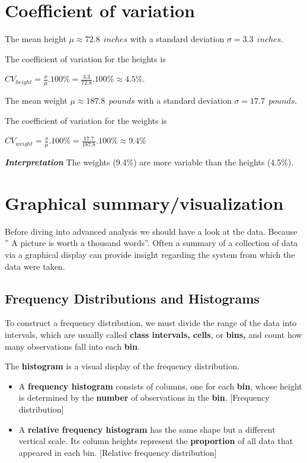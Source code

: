 \documentclass[
  11pt,
  letterpaper,
  DIV=11,
  numbers=noendperiod]{scrreprt}
\begin{document}
\section{Coefficient of variation}

The mean height \(\mu \approx 72.8 \ \ inches\) with a standard
deviation \(\sigma =3.3 \ \ inches\).

The coefficient of variation for the heights is

\hfill\break
\(CV_{height}=\frac{\sigma}{\mu}.100\%=\frac{3.3}{72.8} . 100\% \approx 4.5\%\).

The mean weight \(\mu \approx 187.8 \ \ pounds\) with a standard
deviation \(\sigma =17.7 \ \ pounds\).

The coefficient of variation for the weights is

\(CV_{weight}=\frac{\sigma}{\mu}.100\%=\frac{17.7}{187.8}.100\% \approx9.4\%\)

\textbf{\emph{Interpretation}} The weights (9.4\%) are more variable
than the heights (4.5\%).

\section{Graphical
summary/visualization}\label{graphical-summaryvisualization}

Before diving into advanced analysis we should have a look at the data.
Because '' A picture is worth a thousand words''. Often a summary of a
collection of data via a graphical display can provide insight regarding
the system from which the data were taken.

\subsection{Frequency Distributions and
Histograms}\label{frequency-distributions-and-histograms}

To construct a frequency distribution, we must divide the range of the
data into intervals, which are usually called \textbf{class intervals,
cells}, or \textbf{bins,} and count how many observations fall into each
\textbf{bin}.

The \textbf{histogram} is a visual display of the frequency
distribution.

\begin{itemize}
\item
  A \textbf{frequency histogram} consists of columns, one for each
  \textbf{bin}, whose height is determined by the \textbf{number} of
  observations in the \textbf{bin}. {[}Frequency distribution{]}
\item
  A \textbf{relative frequency histogram} has the same shape but a
  different vertical scale. Its column heights represent the
  \textbf{proportion} of all data that appeared in each bin. {[}Relative
  frequency distribution{]}
\end{itemize}
\end{document}
